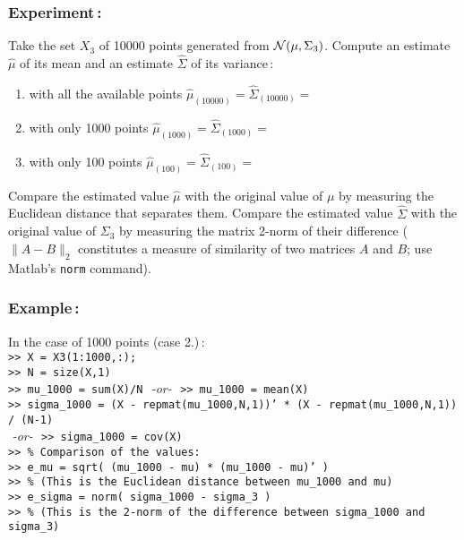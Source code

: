 \documentclass[twoside,a4paper,titlepage]{article}
\newcommand{\mat}[1]{{\tt >> #1} \\}
\newcommand{\com}[1]{{\tt #1}}
\begin{document}
\subsubsection*{Experiment\,:}
Take the set $X_3$ of 10000 points generated from ${\cal
N}(\mu,\Sigma_3)$. Compute an estimate $\hat{\mu}$ of its mean and an
estimate $\hat{\Sigma}$ of its variance\,:
\begin{enumerate}
\item with all the available points \hspace{1cm}$\hat{\mu}_{(10000)}
=$\hspace{3.5cm}$\hat{\Sigma}_{(10000)} =$
\vspace{0.8cm}
\item with only 1000 points \hspace{2cm}$\hat{\mu}_{(1000)}
=$\hspace{3.7cm}$\hat{\Sigma}_{(1000)} =$
\vspace{0.8cm}
\item with only 100 points \hspace{2.1cm}$\hat{\mu}_{(100)}
=$\hspace{3.9cm}$\hat{\Sigma}_{(100)} =$
\vspace{0.8cm}
\end{enumerate}
Compare the estimated value $\hat{\mu}$ with the original value of $\mu$ by
measuring the Euclidean distance that separates them. Compare the estimated
value $\hat{\Sigma}$ with the original value of $\Sigma_3$ by measuring the
matrix 2-norm of their difference ($\parallel A-B \parallel_2$ constitutes
a measure of similarity of two matrices $A$ and $B$; use {\sc Matlab}'s
\com{norm} command).

\subsubsection*{Example\,:}
In the case of 1000 points (case 2.)\,: \\
\mat{X = X3(1:1000,:);}
\mat{N = size(X,1)}
\com{>> mu\_1000 = sum(X)/N} \,\,{\it -or-}\,\, \mat{mu\_1000 = mean(X)}
\mat{sigma\_1000 = (X - repmat(mu\_1000,N,1))' * (X - repmat(mu\_1000,N,1)) / (N-1)}
\,\,{\it -or-}\,\, \mat{sigma\_1000 = cov(X)}

\noindent
\mat{\% Comparison of the values:}
\mat{e\_mu =  sqrt( (mu\_1000 - mu) * (mu\_1000 - mu)' )}
\mat{\% (This is the Euclidean distance between mu\_1000 and mu)}
\mat{e\_sigma = norm( sigma\_1000 - sigma\_3 )}
\com{>> \% (This is the 2-norm of the difference between sigma\_1000 and sigma\_3)}
\end{document}
